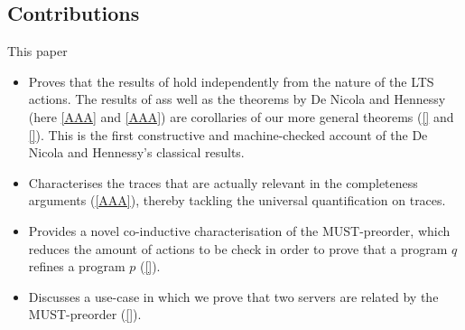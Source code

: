 


\subsection*{Contributions} 
This paper
\begin{itemize}
\item Proves that the results of \cite{} hold independently
  from the nature of the LTS actions. The results of 
  \cite{} ass well as the theorems by De Nicola and Hennessy (here \ref{AAA}
  and \ref{AAA}) 
  are corollaries of our more general theorems (\ref{} and \ref{}).
  This is the first 
  constructive and machine-checked account of the De Nicola and
  Hennessy's classical results.
  
\item Characterises the traces that are actually relevant in the
  completeness arguments (\ref{AAA}),
  thereby tackling the universal
  quantification on traces.

\item Provides a novel co-inductive characterisation of
  the MUST-preorder, which reduces the amount of actions
  to be check in order to prove that a program $q$ refines
  a program $p$ (\ref{}).
  
\item Discusses a use-case in which we prove that two servers
  are related by the MUST-preorder (\ref{}).
\end{itemize}
